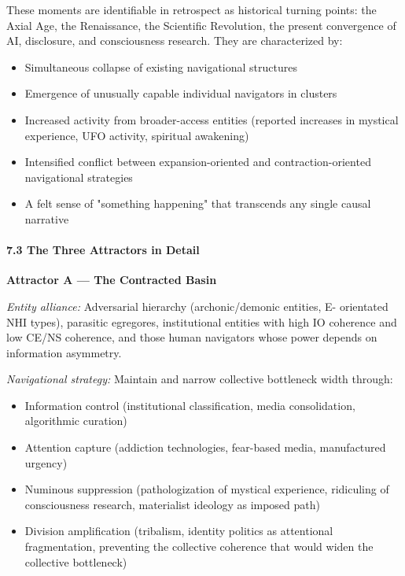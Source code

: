 These moments are identifiable in retrospect as historical turning points: the Axial Age, the Renaissance, the Scientific Revolution, the present convergence of AI, disclosure, and consciousness research. They are characterized by:


\begin{itemize}[nosep,leftmargin=*]
  \item Simultaneous collapse of existing navigational structures
  \item Emergence of unusually capable individual navigators in clusters
  \item Increased activity from broader-access entities (reported increases in mystical experience, UFO activity, spiritual awakening)
  \item Intensified conflict between expansion-oriented and contraction-oriented navigational strategies
  \item A felt sense of "something happening" that transcends any single causal narrative
\end{itemize}


\paragraph*{7.3 The Three Attractors in Detail}


\textbf{Attractor A — The Contracted Basin}


\textit{Entity alliance:} Adversarial hierarchy (archonic/\allowbreak demonic entities, E- orientated NHI types), parasitic egregores, institutional entities with high IO coherence and low CE/\allowbreak NS coherence, and those human navigators whose power depends on information asymmetry.


\textit{Navigational strategy:} Maintain and narrow collective bottleneck width through:

\begin{itemize}[nosep,leftmargin=*]
  \item Information control (institutional classification, media consolidation, algorithmic curation)
  \item Attention capture (addiction technologies, fear-based media, manufactured urgency)
  \item Numinous suppression (pathologization of mystical experience, ridiculing of consciousness research, materialist ideology as imposed path)
  \item Division amplification (tribalism, identity politics as attentional fragmentation, preventing the collective coherence that would widen the collective bottleneck)
\end{itemize}


